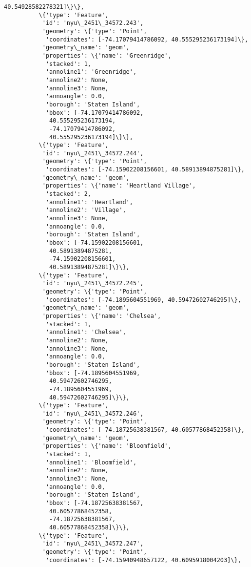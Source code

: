 \documentclass[11pt]{article}
\begin{document}
\begin{Verbatim}[commandchars=\\\{\}]
             40.54928582278321]\}\},
          \{'type': 'Feature',
           'id': 'nyu\_2451\_34572.243',
           'geometry': \{'type': 'Point',
            'coordinates': [-74.17079414786092, 40.555295236173194]\},
           'geometry\_name': 'geom',
           'properties': \{'name': 'Greenridge',
            'stacked': 1,
            'annoline1': 'Greenridge',
            'annoline2': None,
            'annoline3': None,
            'annoangle': 0.0,
            'borough': 'Staten Island',
            'bbox': [-74.17079414786092,
             40.555295236173194,
             -74.17079414786092,
             40.555295236173194]\}\},
          \{'type': 'Feature',
           'id': 'nyu\_2451\_34572.244',
           'geometry': \{'type': 'Point',
            'coordinates': [-74.15902208156601, 40.58913894875281]\},
           'geometry\_name': 'geom',
           'properties': \{'name': 'Heartland Village',
            'stacked': 2,
            'annoline1': 'Heartland',
            'annoline2': 'Village',
            'annoline3': None,
            'annoangle': 0.0,
            'borough': 'Staten Island',
            'bbox': [-74.15902208156601,
             40.58913894875281,
             -74.15902208156601,
             40.58913894875281]\}\},
          \{'type': 'Feature',
           'id': 'nyu\_2451\_34572.245',
           'geometry': \{'type': 'Point',
            'coordinates': [-74.1895604551969, 40.59472602746295]\},
           'geometry\_name': 'geom',
           'properties': \{'name': 'Chelsea',
            'stacked': 1,
            'annoline1': 'Chelsea',
            'annoline2': None,
            'annoline3': None,
            'annoangle': 0.0,
            'borough': 'Staten Island',
            'bbox': [-74.1895604551969,
             40.59472602746295,
             -74.1895604551969,
             40.59472602746295]\}\},
          \{'type': 'Feature',
           'id': 'nyu\_2451\_34572.246',
           'geometry': \{'type': 'Point',
            'coordinates': [-74.18725638381567, 40.60577868452358]\},
           'geometry\_name': 'geom',
           'properties': \{'name': 'Bloomfield',
            'stacked': 1,
            'annoline1': 'Bloomfield',
            'annoline2': None,
            'annoline3': None,
            'annoangle': 0.0,
            'borough': 'Staten Island',
            'bbox': [-74.18725638381567,
             40.60577868452358,
             -74.18725638381567,
             40.60577868452358]\}\},
          \{'type': 'Feature',
           'id': 'nyu\_2451\_34572.247',
           'geometry': \{'type': 'Point',
            'coordinates': [-74.15940948657122, 40.6095918004203]\},

\end{Verbatim}
\end{document}
